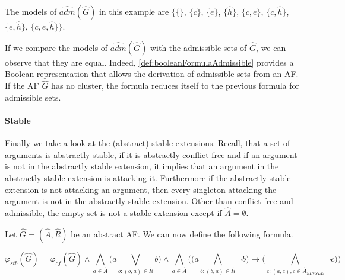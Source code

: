 \begin{example}
The models of $ \hat{adm}(\hat{G})$ in this example are $\big\{\{\}$, $\{c\}$, $\{e\}$, $\{\hat{h}\}$, $\{c, e\}$, $\{c, \hat{h}\}$, $\{e, \hat{h}\}$, $\{c, e, \hat{h}\} \big\}$.
\end{example}

If we compare the models of $ \hat{adm}(\hat{G})$ with the admissible sets of $\hat{G}$, we can observe that they are equal. Indeed, \cref{def:booleanFormulaAdmissible} provides a Boolean representation that allows the derivation of admissible sets from an AF. If the AF $\hat{G}$ has no cluster, the formula reduces itself to the previous formula for admissible sets.



\paragraph{Stable} Finally we take a look at the (abstract) stable extensions. Recall, that a set of arguments is abstractly stable, if it is abstractly conflict-free and if an
argument is not in the abstractly stable extension, it implies that an argument in the
abstractly stable extension is attacking it. Furthermore if the abstractly stable extension
is not attacking an argument, then every singleton attacking the argument is not in the
abstractly stable extension. Other than conflict-free and admissible, the empty set is not a stable extension except if $\hat{A} = \emptyset$.

\begin{definition}
    Let $\hat{G}=(\hat{A},\hat{R})$ be an abstract AF. We can now define the following formula.
    \begin{center}
        \[ \varphi_{stb}(\hat{G}) =
        \varphi_{cf}(\hat{G}) \land \bigwedge_{a \in \hat{A}} \big( a \bigvee_{b:(b,a)\in \hat{R}} b\big) \land \bigwedge_{a \in \hat{A}} \big( \big(  a \bigwedge_{b:(b,a) \in \hat{R}} \lnot b\big)  \rightarrow \big( \bigwedge_{c:(a,c), c \in \hat{A}_{\!S\!I\!N\!G\!L\!E}} \lnot c\big) \big)
        \]
    \end{center}
    \label{def:booleanFormulaStable}
\end{definition}



